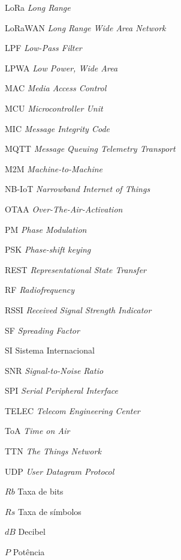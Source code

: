 \documentclass[
  12pt,				%
  openright,			%
  twoside,			%
  a4paper,			%
  english,			%
  french,				%
  spanish,			%
  brazil,				%
  ]{abntex2}
\begin{document}
\begin{siglas}
  \item[LoRa] \textit{Long Range}
  \item[LoRaWAN] \textit{Long Range Wide Area Network}
  \item[LPF] \textit{Low-Pass Filter}
  \item[LPWA] \textit{Low Power, Wide Area}
  \item[MAC] \textit{Media Access Control}
  \item[MCU] \textit{Microcontroller Unit}
  \item[MIC] \textit{Message Integrity Code}
  \item[MQTT] \textit{Message Queuing Telemetry Transport}
  \item[M2M] \textit{Machine-to-Machine}
  \item[NB-IoT] \textit{Narrowband Internet of Things}
  \item[OTAA] \textit{Over-The-Air-Activation}
  \item[PM] \textit{Phase Modulation}
  \item[PSK] \textit{Phase-shift keying}
  \item[REST] \textit{Representational State Transfer}
  \item[RF] \textit{Radiofrequency}
  \item[RSSI] \textit{Received Signal Strength Indicator}
  \item[SF] \textit{Spreading Factor}
  \item[SI] Sistema Internacional
  \item[SNR] \textit{Signal-to-Noise Ratio}
  \item[SPI] \textit{Serial Peripheral Interface}
  \item[TELEC] \textit{Telecom Engineering Center}
  \item[ToA] \textit{Time on Air}
  \item[TTN] \textit{The Things Network}
  \item[UDP] \textit{User Datagram Protocol}

\end{siglas}

\begin{simbolos}
  \item[$ Rb $] Taxa de bits
  \item[$ Rs $] Taxa de símbolos
  \item[$ dB $] Decibel
  \item[$ P $] Potência
\end{simbolos}
\end{document}
